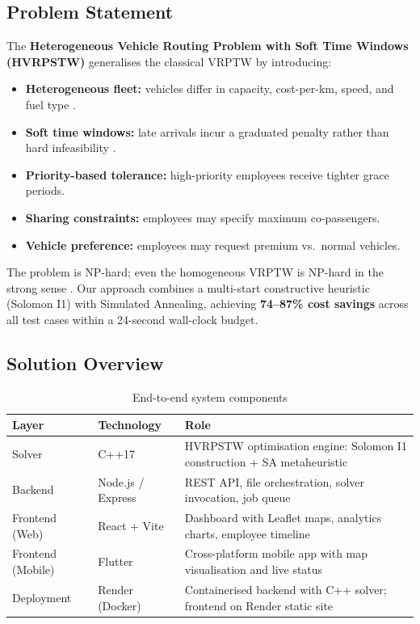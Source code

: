 \documentclass[11pt,a4paper]{article}
\begin{document}
\subsection{Problem Statement}

The \textbf{Heterogeneous Vehicle Routing Problem with Soft Time Windows (HVRPSTW)} generalises the classical VRPTW \cite{solomon1987} by introducing:
\begin{itemize}[nosep, leftmargin=1.2em]
    \item \textbf{Heterogeneous fleet:} vehicles differ in capacity, cost-per-km, speed, and fuel type \cite{dondo2007,golden2008}.
    \item \textbf{Soft time windows:} late arrivals incur a graduated penalty rather than hard infeasibility \cite{taillard1997}.
    \item \textbf{Priority-based tolerance:} high-priority employees receive tighter grace periods.
    \item \textbf{Sharing constraints:} employees may specify maximum co-passengers.
    \item \textbf{Vehicle preference:} employees may request premium vs.\ normal vehicles.
\end{itemize}

The problem is NP-hard; even the homogeneous VRPTW is NP-hard in the strong sense \cite{toth2014}. Our approach combines a multi-start constructive heuristic (Solomon I1) with Simulated Annealing, achieving \textbf{74--87\% cost savings} across all test cases within a 24-second wall-clock budget.

\subsection{Solution Overview}

\begin{table}[H]
\centering
\caption{End-to-end system components}
\label{tab:components}
\small
\begin{tabular}{llp{7.5cm}}
\toprule
\textbf{Layer} & \textbf{Technology} & \textbf{Role} \\
\midrule
\rowcolor{rowalt}
Solver & C++17 & HVRPSTW optimisation engine: Solomon I1 construction + SA metaheuristic \\
Backend & Node.js / Express & REST API, file orchestration, solver invocation, job queue \\
\rowcolor{rowalt}
Frontend (Web) & React + Vite & Dashboard with Leaflet maps, analytics charts, employee timeline \\
Frontend (Mobile) & Flutter & Cross-platform mobile app with map visualisation and live status \\
\rowcolor{rowalt}
Deployment & Render (Docker) & Containerised backend with C++ solver; frontend on Render static site \\
\bottomrule
\end{tabular}
\end{table}
\end{document}
